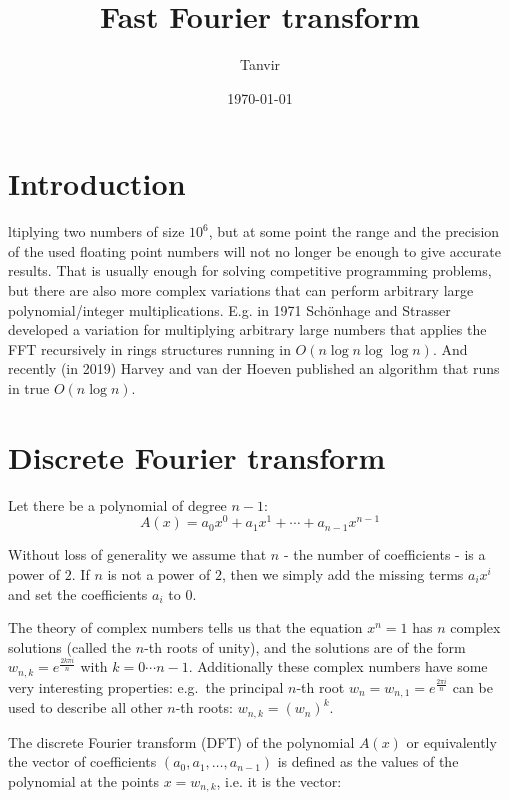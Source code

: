 \documentclass{report}
\title{Fast Fourier transform}
\author{Tanvir}
\date{\today}
\begin{document}
\maketitle

\tableofcontents

\newpage
\chapter{Introduction}
ltiplying two numbers of size $10^6$, but at some point the range and the precision of the used floating point numbers will not no longer be enough to give accurate results. That is usually enough for solving competitive programming problems, but there are also more complex variations that can perform arbitrary large polynomial/integer multiplications. E.g. in 1971 Schönhage and Strasser developed a variation for multiplying arbitrary large numbers that applies the FFT recursively in rings structures running in $O(n \log n \log \log n)$. And recently (in 2019) Harvey and van der Hoeven published an algorithm that runs in true $O(n \log n)$.

\chapter{Discrete Fourier transform}

Let there be a polynomial of degree $n - 1$:
\[A(x) = a_0 x^0 + a_1 x^1 + \cdots + a_{n-1} x^{n-1}\]

Without loss of generality we assume that $n$ - the number of coefficients - is a power of $2$. If $n$ is not a power of $2$, then we simply add the missing terms $a_i x^i$ and set the coefficients $a_i$ to $0$.

The theory of complex numbers tells us that the equation $x^n = 1$ has $n$ complex solutions (called the $n$-th roots of unity), and the solutions are of the form $w_{n, k} = e^{\frac{2 k \pi i}{n}}$ with $k = 0 \cdots n-1$. Additionally these complex numbers have some very interesting properties: e.g.\  the principal $n$-th root $w_n = w_{n, 1} = e^{\frac{2 \pi i}{n}}$ can be used to describe all other $n$-th roots: $w_{n, k} = (w_n)^k$.

The discrete Fourier transform (DFT) of the polynomial $A(x)$ or equivalently the vector of coefficients $(a_0, a_1, \dots, a_{n-1})$ is defined as the values of the polynomial at the points $x = w_{n, k}$, i.e. it is the vector:
\newpage
\end{document}
